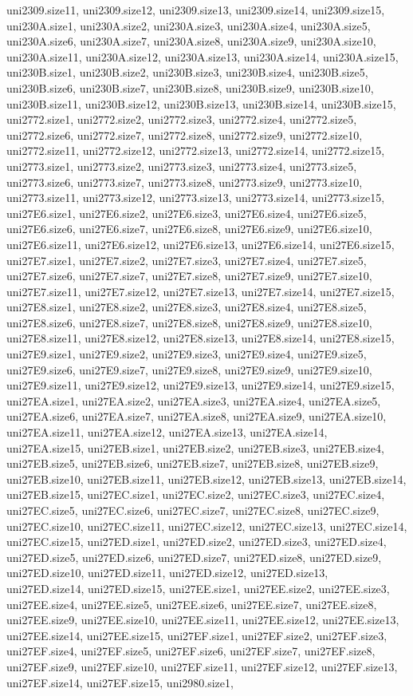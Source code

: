uni2309.size11, uni2309.size12, uni2309.size13, uni2309.size14, uni2309.size15, uni230A.size1, uni230A.size2, uni230A.size3, uni230A.size4, uni230A.size5, uni230A.size6, uni230A.size7, uni230A.size8, uni230A.size9, uni230A.size10, uni230A.size11, uni230A.size12, uni230A.size13, uni230A.size14, uni230A.size15, uni230B.size1, uni230B.size2, uni230B.size3, uni230B.size4, uni230B.size5, uni230B.size6, uni230B.size7, uni230B.size8, uni230B.size9, uni230B.size10, uni230B.size11, uni230B.size12, uni230B.size13, uni230B.size14, uni230B.size15, uni2772.size1, uni2772.size2, uni2772.size3, uni2772.size4, uni2772.size5, uni2772.size6, uni2772.size7, uni2772.size8, uni2772.size9, uni2772.size10, uni2772.size11, uni2772.size12, uni2772.size13, uni2772.size14, uni2772.size15, uni2773.size1, uni2773.size2, uni2773.size3, uni2773.size4, uni2773.size5, uni2773.size6, uni2773.size7, uni2773.size8, uni2773.size9, uni2773.size10, uni2773.size11, uni2773.size12, uni2773.size13, uni2773.size14, uni2773.size15, uni27E6.size1, uni27E6.size2, uni27E6.size3, uni27E6.size4, uni27E6.size5, uni27E6.size6, uni27E6.size7, uni27E6.size8, uni27E6.size9, uni27E6.size10, uni27E6.size11, uni27E6.size12, uni27E6.size13, uni27E6.size14, uni27E6.size15, uni27E7.size1, uni27E7.size2, uni27E7.size3, uni27E7.size4, uni27E7.size5, uni27E7.size6, uni27E7.size7, uni27E7.size8, uni27E7.size9, uni27E7.size10, uni27E7.size11, uni27E7.size12, uni27E7.size13, uni27E7.size14, uni27E7.size15, uni27E8.size1, uni27E8.size2, uni27E8.size3, uni27E8.size4, uni27E8.size5, uni27E8.size6, uni27E8.size7, uni27E8.size8, uni27E8.size9, uni27E8.size10, uni27E8.size11, uni27E8.size12, uni27E8.size13, uni27E8.size14, uni27E8.size15, uni27E9.size1, uni27E9.size2, uni27E9.size3, uni27E9.size4, uni27E9.size5, uni27E9.size6, uni27E9.size7, uni27E9.size8, uni27E9.size9, uni27E9.size10, uni27E9.size11, uni27E9.size12, uni27E9.size13, uni27E9.size14, uni27E9.size15, uni27EA.size1, uni27EA.size2, uni27EA.size3, uni27EA.size4, uni27EA.size5, uni27EA.size6, uni27EA.size7, uni27EA.size8, uni27EA.size9, uni27EA.size10, uni27EA.size11, uni27EA.size12, uni27EA.size13, uni27EA.size14, uni27EA.size15, uni27EB.size1, uni27EB.size2, uni27EB.size3, uni27EB.size4, uni27EB.size5, uni27EB.size6, uni27EB.size7, uni27EB.size8, uni27EB.size9, uni27EB.size10, uni27EB.size11, uni27EB.size12, uni27EB.size13, uni27EB.size14, uni27EB.size15, uni27EC.size1, uni27EC.size2, uni27EC.size3, uni27EC.size4, uni27EC.size5, uni27EC.size6, uni27EC.size7, uni27EC.size8, uni27EC.size9, uni27EC.size10, uni27EC.size11, uni27EC.size12, uni27EC.size13, uni27EC.size14, uni27EC.size15, uni27ED.size1, uni27ED.size2, uni27ED.size3, uni27ED.size4, uni27ED.size5, uni27ED.size6, uni27ED.size7, uni27ED.size8, uni27ED.size9, uni27ED.size10, uni27ED.size11, uni27ED.size12, uni27ED.size13, uni27ED.size14, uni27ED.size15, uni27EE.size1, uni27EE.size2, uni27EE.size3, uni27EE.size4, uni27EE.size5, uni27EE.size6, uni27EE.size7, uni27EE.size8, uni27EE.size9, uni27EE.size10, uni27EE.size11, uni27EE.size12, uni27EE.size13, uni27EE.size14, uni27EE.size15, uni27EF.size1, uni27EF.size2, uni27EF.size3, uni27EF.size4, uni27EF.size5, uni27EF.size6, uni27EF.size7, uni27EF.size8, uni27EF.size9, uni27EF.size10, uni27EF.size11, uni27EF.size12, uni27EF.size13, uni27EF.size14, uni27EF.size15, uni2980.size1, 